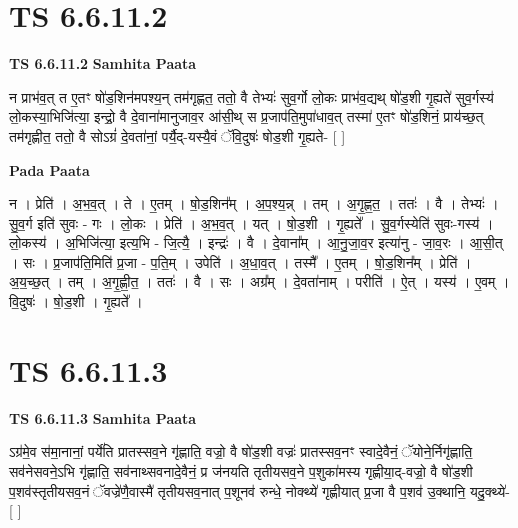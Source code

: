 \documentclass[17pt]{extarticle}
\begin{document}

\section{ TS 6.6.11.2 }

\textbf{TS 6.6.11.2 } \newline
\textbf{Samhita Paata} \newline

न प्राभ॑व॒त् त ए॒तꣳ षो॑ड॒शिन॑मपश्य॒न् तम॑गृह्णत॒ ततो॒ वै तेभ्यः॑ सुव॒र्गो लो॒कः प्राभ॑व॒द्यथ् षो॑ड॒शी गृ॒ह्यते॑ सुव॒र्गस्य॑ लो॒कस्या॒भिजि॑त्या॒ इन्द्रो॒ वै दे॒वाना॑मानुजाव॒र आ॑सी॒थ् स प्र॒जाप॑ति॒मुपा॑धाव॒त् तस्मा॑ ए॒तꣳ षो॑ड॒शिनं॒ प्राय॑च्छ॒त् तम॑गृह्णीत॒ ततो॒ वै सोऽग्रं॑ दे॒वता॑नां॒ पर्यै॒द्-यस्यै॒वं ॅवि॒दुषः॑ षोड॒शी गृ॒ह्यते- [  ] \newline

\textbf{Pada Paata} \newline

न । प्रेति॑ । अ॒भ॒व॒त् । ते । ए॒तम् । षो॒ड॒शिन᳚म् । अ॒प॒श्य॒न्न् । तम् । अ॒गृ॒ह्ण॒त॒ । ततः॑ । वै । तेभ्यः॑ । सु॒व॒र्ग इति॑ सुवः - गः । लो॒कः । प्रेति॑ । अ॒भ॒व॒त् । यत् । षो॒ड॒शी । गृ॒ह्यते᳚ । सु॒व॒र्गस्येति॑ सुवः-गस्य॑ । लो॒कस्य॑ । अ॒भिजि॑त्या॒ इत्य॒भि - जि॒त्यै॒ । इन्द्रः॑ । वै । दे॒वाना᳚म् । आ॒नु॒जा॒व॒र इत्या॑नु - जा॒व॒रः । आ॒सी॒त् । सः । प्र॒जाप॑ति॒मिति॑ प्र॒जा - प॒ति॒म् । उपेति॑ । अ॒धा॒व॒त् । तस्मै᳚ । ए॒तम् । षो॒ड॒शिन᳚म् । प्रेति॑ । अ॒य॒च्छ॒त् । तम् । अ॒गृ॒ह्णी॒त॒ । ततः॑ । वै । सः । अग्र᳚म् । दे॒वता॑नाम् । परीति॑ । ऐ॒त् । यस्य॑ । ए॒वम् । वि॒दुषः॑ । षो॒ड॒शी । गृ॒ह्यते᳚ ।  \newline





\section{ TS 6.6.11.3 }

\textbf{TS 6.6.11.3 } \newline
\textbf{Samhita Paata} \newline

ऽग्र॑मे॒व स॑मा॒नानां॒ पर्ये॑ति प्रातस्सव॒ने गृ॑ह्णाति॒ वज्रो॒ वै षो॑ड॒शी वज्रः॑ प्रातस्सव॒नꣳ स्वादे॒वैनं॒ ॅयोने॒र्निगृ॑ह्णाति॒ सव॑नेसवने॒ऽभि गृ॑ह्णाति॒ सव॑नाथ्सवनादे॒वैनं॒ प्र ज॑नयति तृतीयसव॒ने प॒शुका॑मस्य गृह्णीया॒द्-वज्रो॒ वै षो॑ड॒शी प॒शव॑स्तृतीयसव॒नं ॅवज्रे॑णै॒वास्मै॑ तृतीयसव॒नात् प॒शूनव॑ रुन्धे॒ नोक्थ्ये॑ गृह्णीयात् प्र॒जा वै प॒शव॑ उ॒क्थानि॒ यदु॒क्थ्ये॑- [  ] \newline
\end{document}
